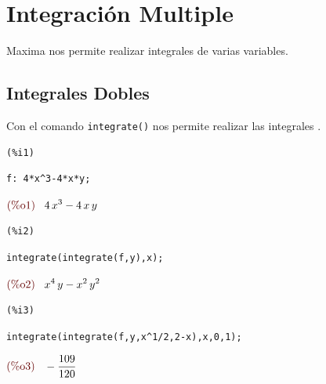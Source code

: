 \documentclass[12pt]{article}
\begin{document}

\section{Integración Multiple}
Maxima nos permite realizar integrales de varias variables.
\subsection{Integrales Dobles}
Con el comando \texttt{integrate()} nos permite realizar las integrales . 

\noindent
\begin{minipage}[t]{8ex}{\color{red}\bf
\begin{verbatim}
(%i1) 
\end{verbatim}}
\end{minipage}
\begin{minipage}[t]{\textwidth}{\color{blue}
\begin{verbatim}
f: 4*x^3-4*x*y;
\end{verbatim}}
\end{minipage}
\begin{math}\displaystyle
\parbox{8ex}{\color{labelcolor}(\%o1) }
4\,{x}^{3}-4\,x\,y
\end{math}


\noindent
\begin{minipage}[t]{8ex}{\color{red}\bf
\begin{verbatim}
(%i2) 
\end{verbatim}}
\end{minipage}
\begin{minipage}[t]{\textwidth}{\color{blue}
\begin{verbatim}
integrate(integrate(f,y),x);
\end{verbatim}}
\end{minipage}
\begin{math}\displaystyle
\parbox{8ex}{\color{labelcolor}(\%o2) }
{x}^{4}\,y-{x}^{2}\,{y}^{2}
\end{math}


\noindent
\begin{minipage}[t]{8ex}{\color{red}\bf
\begin{verbatim}
(%i3) 
\end{verbatim}}
\end{minipage}
\begin{minipage}[t]{\textwidth}{\color{blue}
\begin{verbatim}
integrate(integrate(f,y,x^1/2,2-x),x,0,1);
\end{verbatim}}
\end{minipage}
\begin{math}\displaystyle
\parbox{8ex}{\color{labelcolor}(\%o3) }
-\frac{109}{120}
\end{math}
\end{document}
